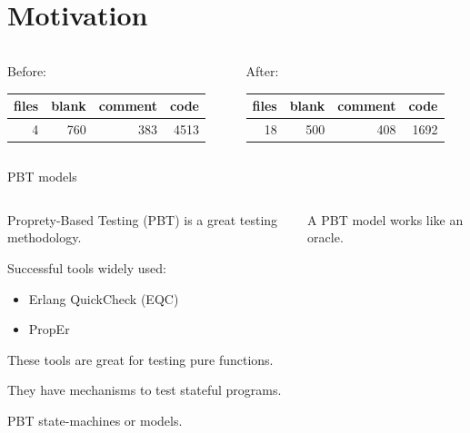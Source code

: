\documentclass[aspectratio=169, 10pt, handout]{beamer}
\begin{document}
\whitetheme

\section{Motivation}
\label{sec:orgeef3a20}
\begin{frame}[label={sec:org646551f}]{}
\begin{columns}
\begin{column}{0.38\columnwidth}
Before:
\begin{center}
\begin{tabular}{rrrr}
files & blank & comment & code\\
\hline
4 & 760 & 383 & 4513\\
\end{tabular}
\end{center}
\end{column}
\begin{column}{0.38\columnwidth}
After:
\begin{center}
\begin{tabular}{rrrr}
files & blank & comment & code\\
\hline
18 & 500 & 408 & 1692\\
\end{tabular}
\end{center}
\end{column}
\end{columns}
\end{frame}

\begin{frame}[label={sec:org421627e}]{PBT models}
\begin{columns}
\begin{column}{0.48\columnwidth}
Proprety-Based Testing (PBT) is a great testing methodology.

\vspace{10pt}

Successful tools widely used:
\begin{itemize}
\item Erlang QuickCheck (EQC)
\item PropEr
\end{itemize}

\vspace{10pt}

These tools are great for testing pure functions.

\vspace{10pt}

They have mechanisms to test stateful programs.

\vspace{10pt}

PBT state-machines or models.
\end{column}

\begin{column}{0.48\columnwidth}
A PBT model works like an oracle.

\vspace{10pt}
\end{column}
\end{columns}
\end{frame}
\end{document}
